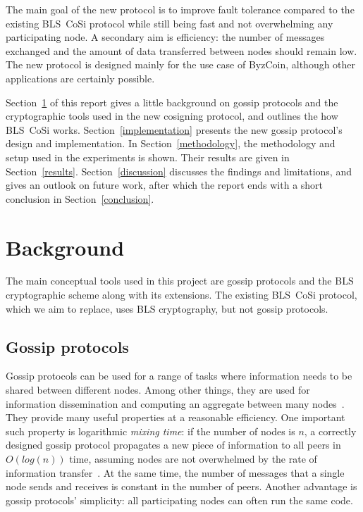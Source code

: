 The main goal of the new protocol is to improve fault tolerance compared to the existing BLS~CoSi protocol while still being fast and not overwhelming any participating node.
A secondary aim is efficiency: the number of messages exchanged and the amount of data transferred between nodes should remain low.
The new protocol is designed mainly for the use case of \mbox{ByzCoin}, although other applications are certainly possible.

Section~\ref{background} of this report gives a little background on gossip protocols and the cryptographic tools used in the new cosigning protocol, and outlines the how BLS~CoSi works.
Section~\ref{implementation} presents the new gossip protocol's design and implementation.
In Section~\ref{methodology}, the methodology and setup used in the experiments is shown.
Their results are given in Section~\ref{results}.
Section~\ref{discussion} discusses the findings and limitations, and gives an outlook on future work, after which the report ends with a short conclusion in Section~\ref{conclusion}.


\section{Background}
\label{background}

The main conceptual tools used in this project are gossip protocols and the BLS cryptographic scheme along with its extensions.
The existing BLS~CoSi protocol, which we aim to replace, uses BLS cryptography, but not gossip protocols.


\subsection{Gossip protocols}
\label{gossip}

Gossip protocols can be used for a range of tasks where information needs to be shared between different nodes.
Among other things, they are used for information dissemination and computing an aggregate between many nodes~\cite{Birm07}.
They provide many useful properties at a reasonable efficiency.
One important such property is logarithmic \emph{mixing time}: if the number of nodes is $n$, a correctly designed gossip protocol propagates a new piece of information to all peers in $O(log(n))$ time, assuming nodes are not overwhelmed by the rate of information transfer~\cite{Birm07}.
At the same time, the number of messages that a single node sends and receives is constant in the number of peers.
Another advantage is gossip protocols' simplicity: all participating nodes can often run the same code.

